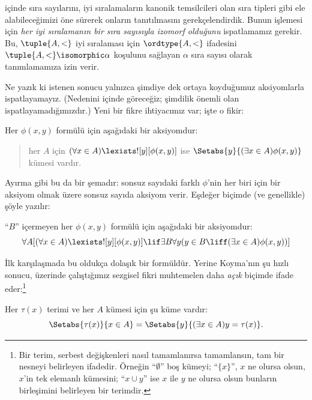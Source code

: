 \documentclass[../../../include/open-logic-section]{subfiles}
\begin{document}

 içinde sıra sayılarını, iyi sıralamaların
kanonik temsilcileri olan sıra tipleri gibi ele alabileceğimizi öne sürerek
onların tanıtılmasını gerekçelendirdik. Bunun işlemesi için \emph{her iyi
sıralamanın bir sıra sayısıyla izomorf olduğunu} ispatlamamız gerekir. Bu,
$\tuple{A,<}$ iyi sıralaması için $\ordtype{A,<}$ ifadesini
$\tuple{A,<}\isomorphic\alpha$ koşulunu sağlayan $\alpha$ sıra sayısı
olarak tanımlamamıza izin verir.

Ne yazık ki istenen sonucu yalnızca şimdiye dek ortaya koyduğumuz
aksiyomlarla ispatlayamayız. (Nedenini
 içinde göreceğiz; şimdilik önemli olan
ispatlayamadığımızdır.) Yeni bir fikre ihtiyacımız var; işte o fikir:

\begin{axiom}
Her $\phi(x,y)$ formülü için aşağıdaki bir aksiyomdur:
\begin{quote}
	her $A$ için $(\forall x \in A)\lexists![y][\phi(x,y)]$ ise
	$\Setabs{y}{(\exists x \in A)\phi(x,y)}$ kümesi vardır.
\end{quote}
\end{axiom}
\noindent
Ayırma gibi bu da bir şemadır: sonsuz sayıdaki farklı $\phi$'nin her biri
için bir aksiyom olmak üzere sonsuz sayıda aksiyom verir. Eşdeğer biçimde
(ve genellikle) şöyle yazılır:

\begin{defish}
``$B$'' içermeyen her $\phi(x,y)$ formülü için aşağıdaki bir aksiyomdur:
\[
\forall A[(\forall x \in A)\lexists![y][\phi(x,y)] \lif \exists B\forall y (y \in B \liff (\exists x \in A)\phi(x,y))]
\]
\end{defish}

İlk karşılaşmada bu oldukça dolaşık bir formüldür. Yerine Koyma'nın şu
hızlı sonucu, üzerinde çalıştığımız sezgisel fikri muhtemelen daha
\emph{açık} biçimde ifade eder:\footnote{Bir terim, serbest değişkenleri
nasıl tamamlanırsa tamamlansın, tam bir nesneyi belirleyen ifadedir.
Örneğin ``$\emptyset$'' boş kümeyi; ``$\{x\}$'', $x$ ne olursa olsun,
$x$'in tek elemanlı kümesini; ``$x\cup y$'' ise $x$ ile $y$ ne olursa
olsun bunların birleşimini belirleyen bir terimdir.}

\begin{cor}
Her $\tau(x)$ terimi ve her $A$ kümesi için şu küme vardır:
\[
	\Setabs{\tau(x)}{x \in A} = \Setabs{y}{(\exists x \in A)y = \tau(x)}.
\]
\end{cor}
\end{document}
